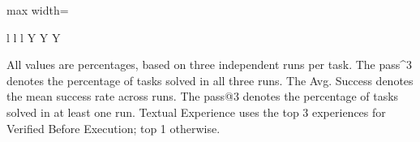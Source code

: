 \begin{table}[t]
\begin{adjustbox}{max width=\textwidth}
\begin{threeparttable}
\begin{tabular}{
        l
        l
        l
        Y Y Y
    }
        \bottomrule
    \end{tabular}

    \begin{tablenotes}[flushleft]
        \footnotesize
        \item[]
        All values are percentages, based on three
        independent runs per task.
        The \mbox{pass\textasciicircum{}3} denotes the percentage of tasks solved in all three runs.
        The Avg. Success denotes the mean success rate across runs.
        The pass@3 denotes the percentage of tasks solved in at
        least one run.
        Textual Experience uses the top 3 experiences for Verified Before Execution; top 1 otherwise.
    \end{tablenotes}

    \end{threeparttable}
    \end{adjustbox}

    \vspace{-0.4cm}
\end{table}
